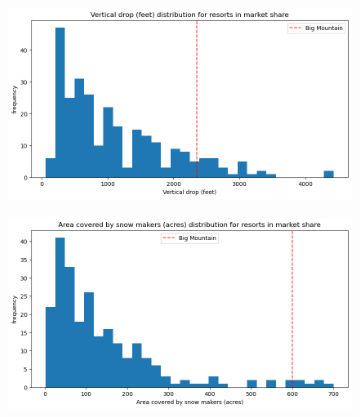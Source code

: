 \documentclass[14pt,a4paper]{extarticle}
\begin{document}
\begin{figure}
		\begin{subfigure}{0.47\textwidth}
			\includegraphics[width=\textwidth]{drop}
			\caption{}
		\end{subfigure}
		\quad
		\begin{subfigure}{0.47\textwidth}
			\includegraphics[width=\textwidth]{snow}
			\caption{}
		\end{subfigure}
		

\end{figure}
\end{document}
